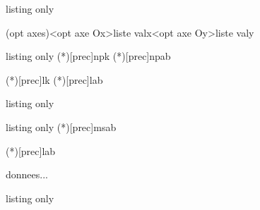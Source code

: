 \documentclass[a4paper,french,11pt]{article}
\begin{document}
\begin{PresCodeTexPL}{listing only}

\AxesTikz[options]
 
\FenetreTikz \OrigineTikz
\FenetreSimpleTikz[options](opt axes)<opt axe Ox>{liste valx}<opt axe Oy>{liste valy}
\PointMoyenTikz[options]

\BoiteMoustaches[options]
\BoiteMoustachesAxe[options]
\end{PresCodeTexPL}

\begin{PresCodeTexPL}{listing only}
\BinomP(*)[prec]{n}{p}{k}
\BinomC(*)[prec]{n}{p}{a}{b}

\PoissonP(*)[prec]{l}{k}
\PoissonC(*)[prec]{l}{a}{b}
\end{PresCodeTexPL}

\begin{PresCodeTexPL}{listing only}

\end{PresCodeTexPL}

\begin{PresCodeTexPL}{listing only}
\NormaleC(*)[prec]{m}{s}{a}{b}

\ExpoC(*)[prec]{l}{a}{b}

\begin{EnvArbreProbasTikz}[options]{donnees}...\end{EnvArbreProbasTikz}

\end{PresCodeTexPL}

\begin{PresCodeTexPL}{listing only}
\end{PresCodeTexPL}
\end{document}
